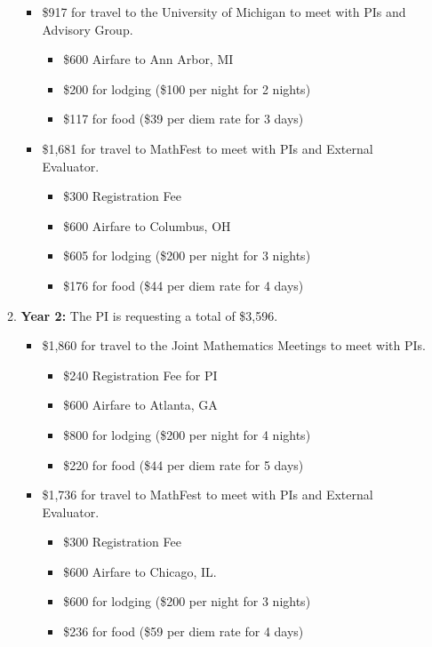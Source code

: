 \documentclass[11pt]{article}
\begin{document}
\begin{enumerate}[leftmargin=*]
\begin{enumerate}
\begin{itemize}
\item \$917 for travel to the University of Michigan to meet with PIs and Advisory Group.
\begin{itemize}
\item \$600 Airfare to Ann Arbor, MI
\item \$200 for lodging (\$100 per night for 2 nights)
\item \$117 for food (\$39 per diem rate for 3 days)
\end{itemize}

\item \$1,681 for travel to MathFest to meet with PIs and External Evaluator.
\begin{itemize}
\item \$300 Registration Fee
\item \$600 Airfare to Columbus, OH
\item \$605 for lodging (\$200 per night for 3 nights)
\item \$176 for food (\$44 per diem rate for 4 days)
\end{itemize}
\end{itemize}

\item[] \textbf{Year 2:} The PI is requesting a total of \$3,596.
\begin{itemize}
\item \$1,860 for travel to the Joint Mathematics Meetings to meet with PIs.
\begin{itemize}
\item \$240 Registration Fee for PI
\item \$600 Airfare to Atlanta, GA
\item \$800 for lodging (\$200 per night for 4 nights)
\item \$220 for food (\$44 per diem rate for 5 days)
\end{itemize}

\item \$1,736 for travel to MathFest to meet with PIs and External Evaluator.
\begin{itemize}
\item \$300 Registration Fee
\item \$600 Airfare to Chicago, IL.
\item \$600 for lodging (\$200 per night for 3 nights)
\item \$236 for food (\$59 per diem rate for 4 days)
\end{itemize}
\end{itemize}


\end{enumerate}
\end{enumerate}
\end{document}
